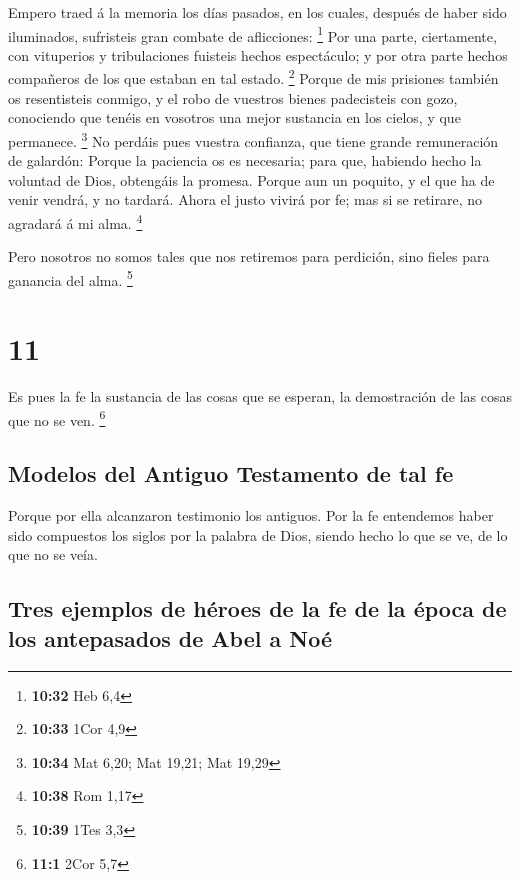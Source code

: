  Empero traed á la memoria los días pasados, en los cuales,
después de haber sido iluminados, sufristeis gran combate de
aflicciones: \footnote{\textbf{10:32} Heb 6,4}  Por una
parte, ciertamente, con vituperios y tribulaciones fuisteis hechos
espectáculo; y por otra parte hechos compañeros de los que estaban en
tal estado. \footnote{\textbf{10:33} 1Cor 4,9}  Porque de
mis prisiones también os resentisteis conmigo, y el robo de vuestros
bienes padecisteis con gozo, conociendo que tenéis en vosotros una mejor
sustancia en los cielos, y que permanece. \footnote{\textbf{10:34} Mat
  6,20; Mat 19,21; Mat 19,29}  No perdáis pues vuestra
confianza, que tiene grande remuneración de galardón: 
Porque la paciencia os es necesaria; para que, habiendo hecho la
voluntad de Dios, obtengáis la promesa.  Porque aun un
poquito, y el que ha de venir vendrá, y no tardará.  Ahora
el justo vivirá por fe; mas si se retirare, no agradará á mi alma.
\footnote{\textbf{10:38} Rom 1,17}

 Pero nosotros no somos tales que nos retiremos para
perdición, sino fieles para ganancia del alma. \footnote{\textbf{10:39}
  1Tes 3,3}

\hypertarget{section-10}{%
\section{11}\label{section-10}}

 Es pues la fe la sustancia de las cosas que se esperan, la
demostración de las cosas que no se ven. \footnote{\textbf{11:1} 2Cor
  5,7}

\hypertarget{modelos-del-antiguo-testamento-de-tal-fe}{%
\subsection{Modelos del Antiguo Testamento de tal
fe}\label{modelos-del-antiguo-testamento-de-tal-fe}}

 Porque por ella alcanzaron testimonio los antiguos.
 Por la fe entendemos haber sido compuestos los siglos por
la palabra de Dios, siendo hecho lo que se ve, de lo que no se veía.

\hypertarget{tres-ejemplos-de-huxe9roes-de-la-fe-de-la-uxe9poca-de-los-antepasados-de-abel-a-nouxe9}{%
\subsection{Tres ejemplos de héroes de la fe de la época de los
antepasados \hspace{0pt}\hspace{0pt}de Abel a
Noé}\label{tres-ejemplos-de-huxe9roes-de-la-fe-de-la-uxe9poca-de-los-antepasados-de-abel-a-nouxe9}}

